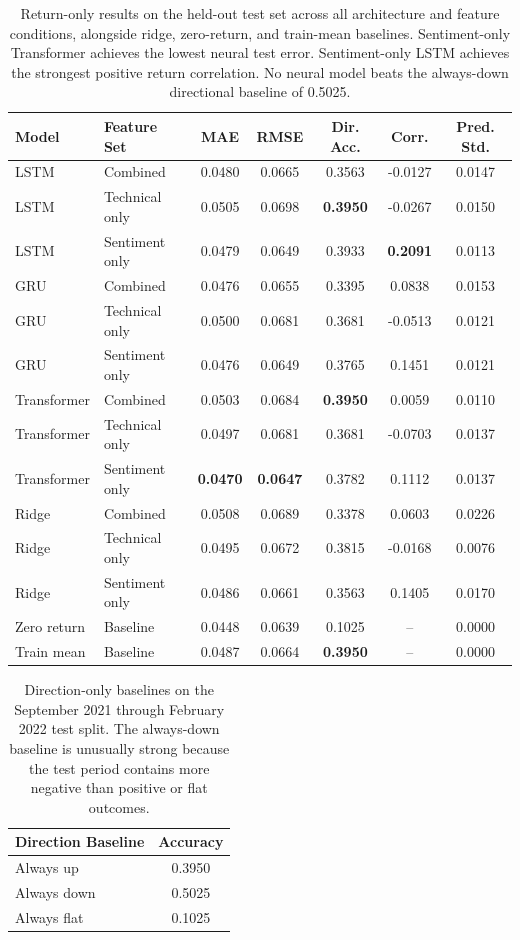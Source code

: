 \documentclass[10pt,twocolumn]{article}
\begin{document}
\begin{table}[t]
\centering
\small
\begin{tabular}{llccccc}
\toprule
Model & Feature Set & MAE & RMSE & Dir. Acc. & Corr. & Pred. Std. \\
\midrule
LSTM & Combined & 0.0480 & 0.0665 & 0.3563 & -0.0127 & 0.0147 \\
LSTM & Technical only & 0.0505 & 0.0698 & \textbf{0.3950} & -0.0267 & 0.0150 \\
LSTM & Sentiment only & 0.0479 & 0.0649 & 0.3933 & \textbf{0.2091} & 0.0113 \\
GRU & Combined & 0.0476 & 0.0655 & 0.3395 & 0.0838 & 0.0153 \\
GRU & Technical only & 0.0500 & 0.0681 & 0.3681 & -0.0513 & 0.0121 \\
GRU & Sentiment only & 0.0476 & 0.0649 & 0.3765 & 0.1451 & 0.0121 \\
Transformer & Combined & 0.0503 & 0.0684 & \textbf{0.3950} & 0.0059 & 0.0110 \\
Transformer & Technical only & 0.0497 & 0.0681 & 0.3681 & -0.0703 & 0.0137 \\
Transformer & Sentiment only & \textbf{0.0470} & \textbf{0.0647} & 0.3782 & 0.1112 & 0.0137 \\
\midrule
Ridge & Combined & 0.0508 & 0.0689 & 0.3378 & 0.0603 & 0.0226 \\
Ridge & Technical only & 0.0495 & 0.0672 & 0.3815 & -0.0168 & 0.0076 \\
Ridge & Sentiment only & 0.0486 & 0.0661 & 0.3563 & 0.1405 & 0.0170 \\
\midrule
Zero return & Baseline & 0.0448 & 0.0639 & 0.1025 & -- & 0.0000 \\
Train mean & Baseline & 0.0487 & 0.0664 & \textbf{0.3950} & -- & 0.0000 \\
\bottomrule
\end{tabular}
\caption{Return-only results on the held-out test set across all architecture and feature conditions, alongside ridge, zero-return, and train-mean baselines. Sentiment-only Transformer achieves the lowest neural test error. Sentiment-only LSTM achieves the strongest positive return correlation. No neural model beats the always-down directional baseline of 0.5025.}
\end{table}

\begin{table}[h]
\centering
\small
\begin{tabular}{lc}
\toprule
Direction Baseline & Accuracy \\
\midrule
Always up & 0.3950 \\
Always down & 0.5025 \\
Always flat & 0.1025 \\
\bottomrule
\end{tabular}
\caption{Direction-only baselines on the September 2021 through February 2022 test split. The always-down baseline is unusually strong because the test period contains more negative than positive or flat outcomes.}
\end{table}
\end{document}
